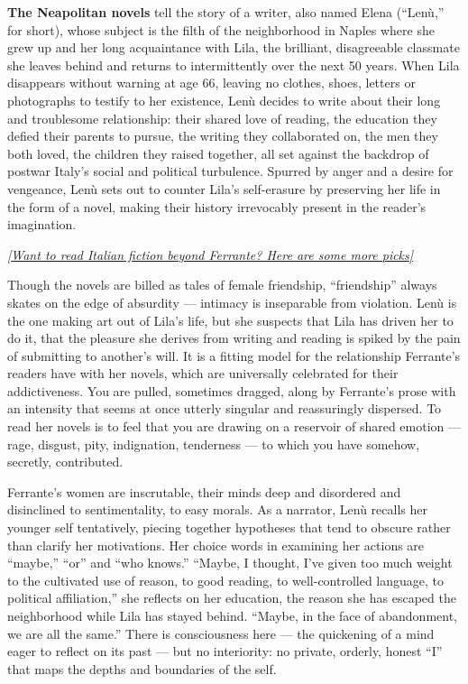 \textbf{The Neapolitan novels} tell the story of a writer, also named
Elena (``Lenù,'' for short), whose subject is the filth of the
neighborhood in Naples where she grew up and her long acquaintance with
Lila, the brilliant, disagreeable classmate she leaves behind and
returns to intermittently over the next 50 years. When Lila disappears
without warning at age 66, leaving no clothes, shoes, letters or
photographs to testify to her existence, Lenù decides to write about
their long and troublesome relationship: their shared love of reading,
the education they defied their parents to pursue, the writing they
collaborated on, the men they both loved, the children they raised
together, all set against the backdrop of postwar Italy's social and
political turbulence. Spurred by anger and a desire for vengeance, Lenù
sets out to counter Lila's self-erasure by preserving her life in the
form of a novel, making their history irrevocably present in the
reader's imagination.

\href{https://www.nytimes3xbfgragh.onion/2018/05/18/books/review/animal-gazer-edgardo-franzosini.html?action=click\&module=Intentional\&pgtype=Article}{\emph{{[}Want
to read Italian fiction beyond Ferrante? Here are some more picks{]}}}

Though the novels are billed as tales of female friendship,
``friendship'' always skates on the edge of absurdity --- intimacy is
inseparable from violation. Lenù is the one making art out of Lila's
life, but she suspects that Lila has driven her to do it, that the
pleasure she derives from writing and reading is spiked by the pain of
submitting to another's will. It is a fitting model for the relationship
Ferrante's readers have with her novels, which are universally
celebrated for their addictiveness. You are pulled, sometimes dragged,
along by Ferrante's prose with an intensity that seems at once utterly
singular and reassuringly dispersed. To read her novels is to feel that
you are drawing on a reservoir of shared emotion --- rage, disgust,
pity, indignation, tenderness --- to which you have somehow, secretly,
contributed.

Ferrante's women are inscrutable, their minds deep and disordered and
disinclined to sentimentality, to easy morals. As a narrator, Lenù
recalls her younger self tentatively, piecing together hypotheses that
tend to obscure rather than clarify her motivations. Her choice words in
examining her actions are ``maybe,'' ``or'' and ``who knows.'' ``Maybe,
I thought, I've given too much weight to the cultivated use of reason,
to good reading, to well-controlled language, to political
affiliation,'' she reflects on her education, the reason she has escaped
the neighborhood while Lila has stayed behind. ``Maybe, in the face of
abandonment, we are all the same.'' There is consciousness here --- the
quickening of a mind eager to reflect on its past --- but no
interiority: no private, orderly, honest ``I'' that maps the depths and
boundaries of the self.

